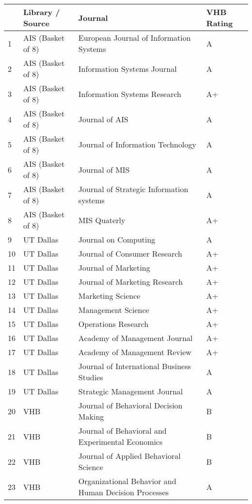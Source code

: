 \begin{table}[h!]
\small
\centering
\begin{tabular}{|l|l|p{8.5cm}|l|}
\hline
 & \textbf{Library / Source} & \textbf{Journal} & \textbf{VHB Rating} \\ \hline
1 & AIS (Basket of 8) & European Journal of Information Systems & A \\ \hline
2 & AIS (Basket of 8) & Information Systems Journal & A \\ \hline
3 & AIS (Basket of 8) & Information Systems Research & A+ \\ \hline
4 & AIS (Basket of 8) & Journal of AIS & A \\ \hline
5 & AIS (Basket of 8) & Journal of Information Technology & A \\ \hline
6 & AIS (Basket of 8) & Journal of MIS & A \\ \hline
7 & AIS (Basket of 8) & Journal of Strategic Information systems & A \\ \hline
8 & AIS (Basket of 8) & MIS Quaterly & A+ \\ \hline
9 & UT Dallas & Journal on Computing & A \\ \hline
10 & UT Dallas & Journal of Consumer Research & A+ \\ \hline
11 & UT Dallas & Journal of Marketing & A+ \\ \hline
12 & UT Dallas & Journal of Marketing Research & A+ \\ \hline
13 & UT Dallas & Marketing Science & A+ \\ \hline
14 & UT Dallas & Management Science & A+ \\ \hline
15 & UT Dallas & Operations Research & A+ \\ \hline
16 & UT Dallas & Academy of Management Journal & A+ \\ \hline
17 & UT Dallas & Academy of Management Review & A+ \\ \hline
18 & UT Dallas & Journal of International Business Studies & A \\ \hline
19 & UT Dallas & Strategic Management Journal & A \\ \hline
20 & VHB & Journal of Behavioral Decision Making & B \\ \hline
21 & VHB & Journal of Behavioral and Experimental Economics & B \\ \hline
22 & VHB & Journal of Applied Behavioral Science & B \\ \hline
23 & VHB & Organizational Behavior and Human Decision Processes & A \\ \hline

\end{tabular}
\end{table}

